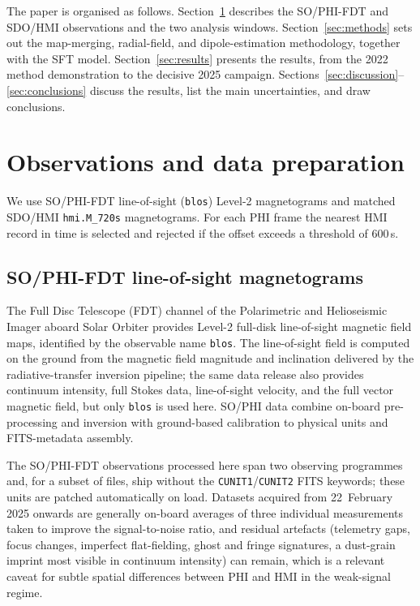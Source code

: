 \documentclass{aa}
\begin{document}
The paper is organised as follows. Section~\ref{sec:data} describes the SO/PHI-FDT and SDO/HMI observations and the two analysis windows. Section~\ref{sec:methods} sets out the map-merging, radial-field, and dipole-estimation methodology, together with the SFT model. Section~\ref{sec:results} presents the results, from the 2022 method demonstration to the decisive 2025 campaign. Sections~\ref{sec:discussion}--\ref{sec:conclusions} discuss the results, list the main uncertainties, and draw conclusions.

\section{Observations and data preparation}
\label{sec:data}

We use SO/PHI-FDT line-of-sight (\texttt{blos}) Level-2 magnetograms and matched SDO/HMI \texttt{hmi.M\_720s} magnetograms. For each PHI frame the nearest HMI record in time is selected and rejected if the offset exceeds a threshold of 600\,s.

\subsection{SO/PHI-FDT line-of-sight magnetograms}
\label{sec:data-phi}

The Full Disc Telescope (FDT) channel of the Polarimetric and Helioseismic Imager aboard Solar Orbiter \citep{Solanki2020} provides Level-2 full-disk line-of-sight magnetic field maps, identified by the observable name \texttt{blos}. The line-of-sight field is computed on the ground from the magnetic field magnitude and inclination delivered by the radiative-transfer inversion pipeline; the same data release also provides continuum intensity, full Stokes data, line-of-sight velocity, and the full vector magnetic field, but only \texttt{blos} is used here. SO/PHI data combine on-board pre-processing and inversion with ground-based calibration to physical units and FITS-metadata assembly.

The SO/PHI-FDT observations processed here span two observing programmes and, for a subset of files, ship without the \texttt{CUNIT1}/\texttt{CUNIT2} FITS keywords; these units are patched automatically on load. Datasets acquired from 22~February 2025 onwards are generally on-board averages of three individual measurements taken to improve the signal-to-noise ratio, and residual artefacts (telemetry gaps, focus changes, imperfect flat-fielding, ghost and fringe signatures, a dust-grain imprint most visible in continuum intensity) can remain, which is a relevant caveat for subtle spatial differences between PHI and HMI in the weak-signal regime.
\end{document}
